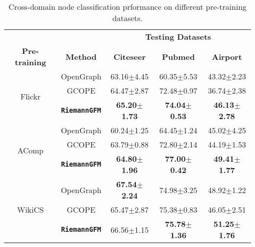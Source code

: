     \begin{table}[t]
        \caption{Cross-domain node classification prformance on different pre-training datasets.}
        \vspace{-0.03in}
        \label{tab:diff-train-2}
        \centering
        \begin{tabular}{c  c | cc  c  }
        \hline
        & & \multicolumn{3}{c}{\textbf{Testing Datasets}}\\
        \textbf{Pre-training} & \textbf{Method}  & \textbf{Citeseer} & \textbf{Pubmed}  & \textbf{Airport}  \\
        \hline
        \multirow{3}{*}{Flickr}
        & OpenGraph 
        & 63.16\scriptsize{$\pm$4.45} 
        & 60.35\scriptsize{$\pm$5.53} 
        & 43.32\scriptsize{$\pm$2.23} \\
        & GCOPE &64.47\scriptsize{$\pm$2.87} &72.48\scriptsize{$\pm$0.97} & 36.74\scriptsize{$\pm$2.38} \\
        & \textbf{\texttt{RiemannGFM}}  &  \textbf{65.20\scriptsize{$\pm$1.73}} &\textbf{74.04\scriptsize{$\pm$0.53} }& \textbf{46.13\scriptsize{$\pm$2.78} }\\
        \hline
        \multirow{3}{*}{AComp}
        & OpenGraph 
        & 60.24\scriptsize{$\pm$1.25} 
        & 64.45\scriptsize{$\pm$1.24} 
        & 45.02\scriptsize{$\pm$4.25} \\
        & GCOPE &   63.79\scriptsize{$\pm$0.88} &72.80\scriptsize{$\pm$2.14} & 44.19\scriptsize{$\pm$1.53} \\
          & \textbf{\texttt{RiemannGFM}}  &  \textbf{64.80\scriptsize{$\pm$1.96}} &\textbf{77.00\scriptsize{$\pm$0.42}} & \textbf{49.41\scriptsize{$\pm$1.77} }\\
        \hline
        \multirow{3}{*}{WikiCS}
        & OpenGraph 
        & \textbf{67.54\scriptsize{$\pm$2.24}} 
        & 74.98\scriptsize{$\pm$3.25} 
        & 48.92\scriptsize{$\pm$1.22} \\
        & GCOPE &   65.47\scriptsize{$\pm$2.87} &75.38\scriptsize{$\pm$0.83} & 46.05\scriptsize{$\pm$2.51} \\
        & \textbf{\texttt{RiemannGFM}}  &  66.56\scriptsize{$\pm$1.15}&\textbf{75.78\scriptsize{$\pm$1.36}} & \textbf{51.25\scriptsize{$\pm$1.76}} \\
        \hline
        \end{tabular}
                \vspace{-0.05in}
        \end{table}



